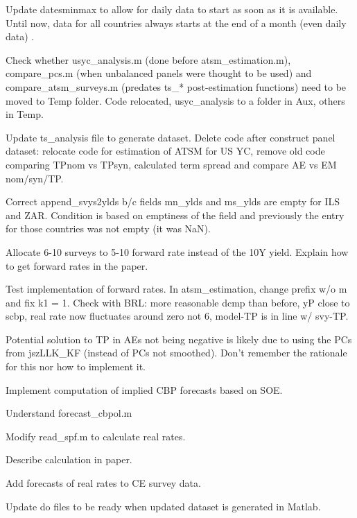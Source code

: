 \documentclass[12pt]{article}
\newcommand{\cmark}{\ding{51}}
\newcommand{\xmark}{\ding{55}}
\newcommand{\done}{\rlap{$\square$}{\raisebox{2pt}{\large\hspace{1pt}\cmark}}%
	\hspace{-2.5pt}}
\newcommand{\wontdo}{\rlap{$\square$}{\large\hspace{1pt}\xmark}}
\begin{document}
\begin{todolist}
\begin{todolist}
		\item[\done] Update datesminmax to allow for daily data to start as soon as it is available. Until now, data for all countries always starts at the end of a month (even daily data) .
		\item[\done] Check whether usyc_analysis.m (done before atsm_estimation.m), compare_pcs.m (when unbalanced panels were thought to be used) and compare_atsm_surveys.m (predates ts_* post-estimation functions) need to be moved to Temp folder. Code relocated, usyc_analysis to a folder in Aux, others in Temp.
		\item[\done] Update ts_analysis file to generate dataset. Delete code after construct panel dataset: relocate code for estimation of ATSM for US YC, remove old code comparing TPnom vs TPsyn, calculated term spread and compare AE vs EM nom/syn/TP.
		\item[\done] Correct append_svys2ylds b/c fields mn_ylds and ms_ylds are empty for ILS and ZAR. Condition is based on emptiness of the field and previously the entry for those countries was not empty (it was NaN).
		\item[\done] Allocate 6-10 surveys to 5-10 forward rate instead of the 10Y yield. Explain how to get forward rates in the paper.
		\item[\done] Test implementation of forward rates. In atsm_estimation, change prefix w/o m and fix k1 = 1. Check with BRL: more reasonable dcmp than before, yP close to scbp, real rate now fluctuates around zero not 6, model-TP is in line w/ svy-TP.
		\item[\wontdo] Potential solution to TP in AEs not being negative is likely due to using the PCs from jszLLK_KF (instead of PCs not smoothed). Don't remember the rationale for this nor how to implement it.
	\end{todolist}
	\item[\done] Implement computation of implied CBP forecasts based on SOE.
	\begin{todolist}
		\item[\done] Understand forecast_cbpol.m
		\item[\done] Modify read_spf.m to calculate real rates.
		\item[\done] Describe calculation in paper.
		\item[\done] Add forecasts of real rates to CE survey data.
	\end{todolist}
	\item[\done] Update do files to be ready when updated dataset is generated in Matlab.

\end{todolist}
\end{document}
